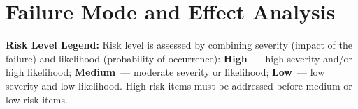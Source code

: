 \documentclass{article}
\begin{document}
\newpage
{}
\recalctypearea

\section{Failure Mode and Effect Analysis}

\noindent\textbf{Risk Level Legend:}
Risk level is assessed by combining severity (impact of the failure) and
likelihood (probability of occurrence): \textbf{High}~--- high severity
and/or high likelihood; \textbf{Medium}~--- moderate severity or likelihood;
\textbf{Low}~--- low severity and low likelihood.
High-risk items must be addressed before medium or low-risk items.
\end{document}
